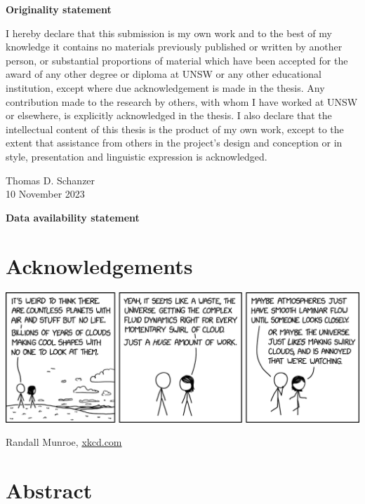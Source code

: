 \documentclass[../main.tex]{subfiles}
\begin{document}
\vspace*{\fill}
\begin{center}
{\textbf{Originality statement}}

\begin{minipage}{0.7\linewidth}
    I hereby declare that this submission is my own work and to the best of
    my knowledge it contains no materials previously published or written by
    another person, or substantial proportions of material which have been
    accepted for the award of any other degree or diploma at UNSW or any
    other educational institution, except where due acknowledgement is made
    in the thesis. Any contribution made to the research by others, with
    whom I have worked at UNSW or elsewhere, is explicitly acknowledged in
    the thesis. I also declare that the intellectual content of this thesis
    is the product of my own work, except to the extent that assistance from
    others in the project's design and conception or in style, presentation
    and linguistic expression is acknowledged.

    \begin{flushright}
        Thomas D. Schanzer \\ 10 November 2023
    \end{flushright}
\end{minipage}
\end{center}
\vspace{1cm}
\begin{center}
{\textbf{Data availability statement}}

\begin{minipage}{0.7\linewidth}
    \todo{}
\end{minipage}
\end{center}
\vspace{3cm}
\vfill

\makeatletter\@openrightfalse\makeatother
\chapter*{Acknowledgements}

\clearpage
\vspace*{\fill}
\begin{center}
    \includegraphics[width=\linewidth]{figures/cloud_swirls.png}

    {
        \footnotesize \color{gray}
        Randall Munroe, \href{https://xkcd.com/2664/}{xkcd.com}
    }
\end{center}
\vfill

\chapter*{Abstract}

\tableofcontents

\makeatletter\@openrighttrue\makeatother
\mainmatter
\end{document}
